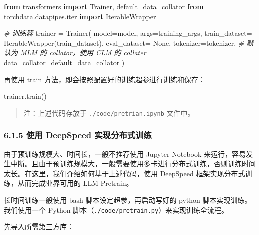 \documentclass[
]{article}
\newenvironment{Shaded}{}{}
\newcommand{\BuiltInTok}[1]{\textcolor[rgb]{0.00,0.50,0.00}{#1}}
\newcommand{\CommentTok}[1]{\textcolor[rgb]{0.38,0.63,0.69}{\textit{#1}}}
\newcommand{\ImportTok}[1]{\textcolor[rgb]{0.00,0.50,0.00}{\textbf{#1}}}
\newcommand{\NormalTok}[1]{#1}
\newcommand{\OperatorTok}[1]{\textcolor[rgb]{0.40,0.40,0.40}{#1}}
\newcommand{\VariableTok}[1]{\textcolor[rgb]{0.10,0.09,0.49}{#1}}
\begin{document}
\begin{Shaded}
\begin{Highlighting}[]
\ImportTok{from}\NormalTok{ transformers }\ImportTok{import}\NormalTok{ Trainer, default\_data\_collator}
\ImportTok{from}\NormalTok{ torchdata.datapipes.}\BuiltInTok{iter} \ImportTok{import}\NormalTok{ IterableWrapper}

\CommentTok{\# 训练器}
\NormalTok{trainer }\OperatorTok{=}\NormalTok{ Trainer(}
\NormalTok{    model}\OperatorTok{=}\NormalTok{model,}
\NormalTok{    args}\OperatorTok{=}\NormalTok{training\_args,}
\NormalTok{    train\_dataset}\OperatorTok{=}\NormalTok{ IterableWrapper(train\_dataset),}
\NormalTok{    eval\_dataset}\OperatorTok{=} \VariableTok{None}\NormalTok{,}
\NormalTok{    tokenizer}\OperatorTok{=}\NormalTok{tokenizer,}
    \CommentTok{\# 默认为 MLM 的 collator，使用 CLM 的 collater}
\NormalTok{    data\_collator}\OperatorTok{=}\NormalTok{default\_data\_collator}
\NormalTok{)}
\end{Highlighting}
\end{Shaded}

再使用 train 方法，即会按照配置好的训练超参进行训练和保存：

\begin{Shaded}
\begin{Highlighting}[]
\NormalTok{trainer.train()}
\end{Highlighting}
\end{Shaded}

\begin{quote}
注：上述代码存放于 \texttt{./code/pretrian.ipynb} 文件中。
\end{quote}

\subsubsection{6.1.5 使用 DeepSpeed
实现分布式训练}\label{ux4f7fux7528-deepspeed-ux5b9eux73b0ux5206ux5e03ux5f0fux8badux7ec3}

由于预训练规模大、时间长，一般不推荐使用 Jupyter Notebook
来运行，容易发生中断。且由于预训练规模大，一般需要使用多卡进行分布式训练，否则训练时间太长。在这里，我们介绍如何基于上述代码，使用
DeepSpeed 框架实现分布式训练，从而完成业界可用的 LLM Pretrain。

长时间训练一般使用 bash 脚本设定超参，再启动写好的 python
脚本实现训练。我们使用一个 Python
脚本（\texttt{./code/pretrain.py}）来实现训练全流程。

先导入所需第三方库：
\end{document}
